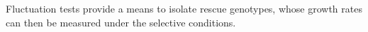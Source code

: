 \documentclass[9pt,twocolumn,twoside,lineno]{gsajnl}
\begin{document}
Fluctuation tests \citep{luria1943mutations} provide a means to isolate rescue genotypes, whose growth rates can then be measured under the selective conditions.
\end{document}
